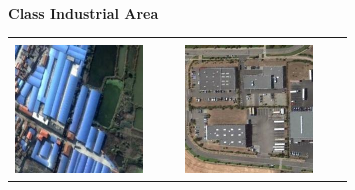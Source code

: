 \begin{figure}[h]
\begin{tabular}{|p{0.4\linewidth}p{0.4\linewidth}|}
\hline
\end{tabular}
\\
\textbf{Class Industrial Area}
\\
\begin{tabular}{|p{0.4\linewidth}p{0.4\linewidth}|}
\hline & \\
\includegraphics[width=\linewidth,frame]{figures/examples_assests/linear_probing/industry_1.pdf} &
\includegraphics[width=\linewidth,frame]{figures/examples_assests/linear_probing/industry_2.pdf} \\

\end{tabular}
\end{figure}
